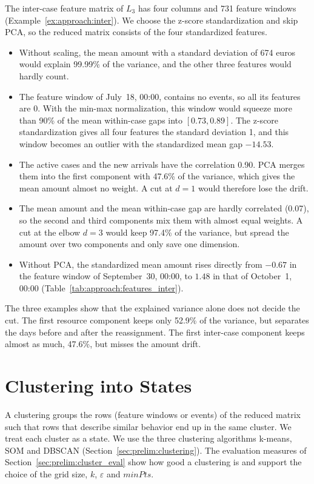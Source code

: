 \begin{example}
	\label{ex:approach:reduction_inter}
	The inter-case feature matrix of $L_3$ has four columns and 731 feature windows (Example~\ref{ex:approach:inter}). We choose the z-score standardization and skip PCA, so the reduced matrix consists of the four standardized features.
	\begin{itemize}
		\item Without scaling, the mean amount with a standard deviation of 674 euros would explain 99.99\% of the variance, and the other three features would hardly count.

		\item The feature window of July~18, 00:00, contains no events, so all its features are 0. With the min-max normalization, this window would squeeze more than 90\% of the mean within-case gaps into $[0.73, 0.89]$. The z-score standardization gives all four features the standard deviation 1, and this window becomes an outlier with the standardized mean gap $-14.53$.

		\item The active cases and the new arrivals have the correlation 0.90. PCA merges them into the first component with 47.6\% of the variance, which gives the mean amount almost no weight. A cut at $d = 1$ would therefore lose the drift.

		\item The mean amount and the mean within-case gap are hardly correlated (0.07), so the second and third components mix them with almost equal weights. A cut at the elbow $d = 3$ would keep 97.4\% of the variance, but spread the amount over two components and only save one dimension.

		\item Without PCA, the standardized mean amount rises directly from $-0.67$ in the feature window of September~30, 00:00, to $1.48$ in that of October~1, 00:00 (Table~\ref{tab:approach:features_inter}).
	\end{itemize}
\end{example}

The three examples show that the explained variance alone does not decide the cut. The first resource component keeps only 52.9\% of the variance, but separates the days before and after the reassignment. The first inter-case component keeps almost as much, 47.6\%, but misses the amount drift.

\section{Clustering into States}
\label{sec:approach:clustering}
A clustering groups the rows (feature windows or events) of the reduced matrix such that rows that describe similar behavior end up in the same cluster. We treat each cluster as a state. We use the three clustering algorithms k-means, SOM and DBSCAN (Section~\ref{sec:prelim:clustering}). The evaluation measures of Section~\ref{sec:prelim:cluster_eval} show how good a clustering is and support the choice of the grid size, $k$, $\varepsilon$ and $\mathit{minPts}$.

